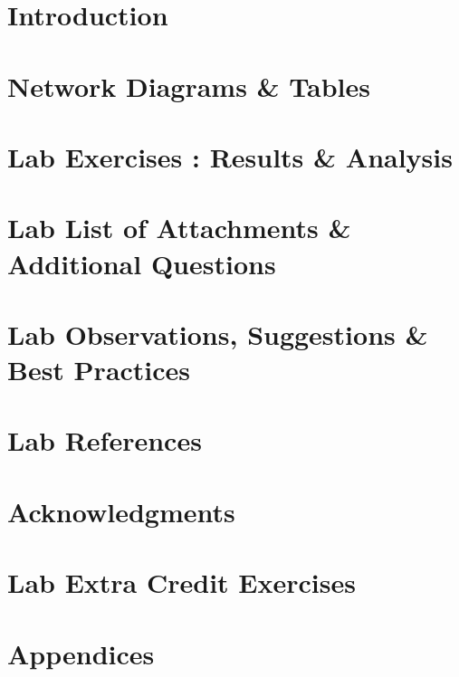 \documentclass{report}
\begin{document}

\tableofcontents
\listoffigures
\listoftables


\newpage
\section{Introduction} \label{sec1}


\newpage
\section{Network Diagrams \& Tables} \label{sec2}


\newpage
\section{Lab Exercises : Results \& Analysis}\label{sec3}


\newpage    


\newpage    


\newpage    


\newpage    


\newpage
\section{Lab List of Attachments \& Additional Questions} \label{sec4}


\section{Lab Observations, Suggestions \& Best Practices} \label{sec5}


\section{Lab References} \label{sec6}


\section{Acknowledgments} \label{sec7}


\newpage
\section{Lab Extra Credit Exercises} \label{sec8}


\newpage
\section{Appendices} \label{sec9}

\end{document}
